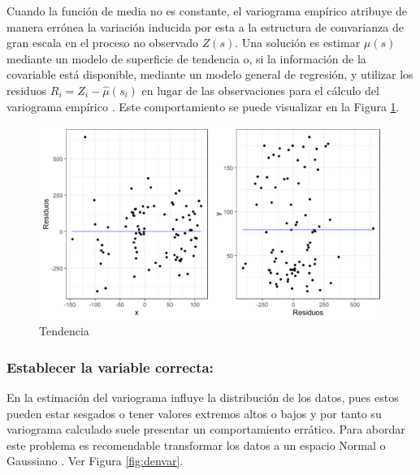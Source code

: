 \documentclass[
]{book}
\begin{document}
Cuando la función de media no es constante, el variograma empírico atribuye de manera errónea la variación inducida por esta a la estructura de convarianza de gran escala en el proceso no observado \(Z(s)\). Una solución es estimar \(\mu(s)\) mediante un modelo de superficie de tendencia o, si la información de la covariable está disponible, mediante un modelo general de regresión, y utilizar los residuos \(R_i=Z_i-\hat{\mu}(s_i)\) en lugar de las observaciones para el cálculo del variograma empírico \citep{peter}. Este comportamiento se puede visualizar en la Figura \ref{fig:rcoordtrend}.

\begin{figure}
\includegraphics[width=17.78in]{figuras/otros/rcoord_trend} \caption{Tendencia}\label{fig:rcoordtrend}
\end{figure}

\hypertarget{establecer-la-variable-correcta}{%
\subsubsection*{Establecer la variable correcta:}\label{establecer-la-variable-correcta}}

En la estimación del variograma influye la distribución de los datos, pues estos pueden estar sesgados o tener valores extremos altos o bajos y por tanto su variograma calculado suele presentar un comportamiento errático. Para abordar este problema es recomendable transformar los datos a un espacio Normal o Gaussiano \citep{garten}. Ver Figura \ref{fig:denvar}.
\end{document}
